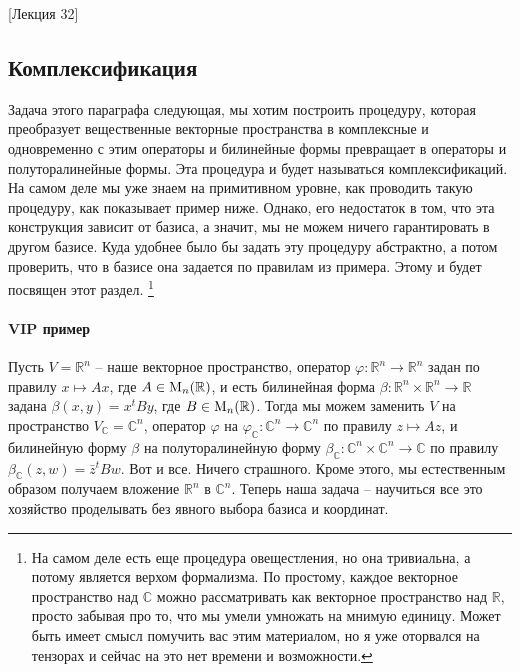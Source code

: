 [Лекция 32]


\subsection{Комплексификация}

Задача этого параграфа следующая, мы хотим построить процедуру, которая преобразует вещественные векторные пространства в комплексные и одновременно с этим операторы и билинейные формы превращает в операторы и полуторалинейные формы.
Эта процедура и будет называться комплексификаций.
На самом деле мы уже знаем на примитивном уровне, как проводить такую процедуру, как показывает пример ниже.
Однако, его недостаток в том, что эта конструкция зависит от базиса, а значит, мы не можем ничего гарантировать в другом базисе.
Куда удобнее было бы задать эту процедуру абстрактно, а потом проверить, что в базисе она задается по правилам из примера.
Этому и будет посвящен этот раздел.%
\footnote{На самом деле есть еще процедура овещестления, но она тривиальна, а потому является верхом формализма.
По простому, каждое векторное пространство над $\mathbb C$ можно рассматривать как векторное пространство над $\mathbb R$, просто забывая про то, что мы умели умножать на мнимую единицу.
Может быть имеет смысл помучить вас этим материалом, но я уже оторвался на тензорах и сейчас на это нет времени и возможности.}

\paragraph{VIP пример}

Пусть $V = \mathbb R^n$ -- наше векторное пространство, оператор $\varphi \colon \mathbb R^n\to \mathbb R^n$ задан по правилу $x \mapsto Ax$, где $A\in \operatorname{M}_{n}(\mathbb R)$, и есть билинейная форма $\beta \colon \mathbb R^n\times \mathbb R^n\to \mathbb R$ задана $\beta(x,y) = x^t By$, где $B\in \operatorname{M}_{n}(\mathbb R)$.
Тогда мы можем заменить $V$ на пространство $V_{\mathbb C} = \mathbb C^n$, оператор $\varphi$ на $\varphi_{\mathbb C}\colon \mathbb C^n \to \mathbb C^n$ по правилу $z\mapsto Az$, и билинейную форму $\beta$ на полуторалинейную форму $\beta_{\mathbb C}\colon \mathbb C^n \times \mathbb C^n \to \mathbb C$ по правилу $\beta_{\mathbb C}(z, w)= \bar z^t B w$.
Вот и все.
Ничего страшного.
Кроме этого, мы естественным образом получаем вложение $\mathbb R^n$ в $\mathbb C^n$.
Теперь наша задача -- научиться все это хозяйство проделывать без явного выбора базиса и координат.

